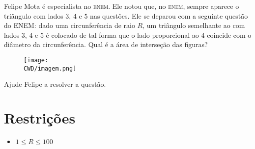 %

Felipe Mota é especialista no \textsc{enem}. Ele notou que, no \textsc{enem}, sempre aparece o triângulo com lados 3, 4 e 5 nas questôes. Ele se deparou com a seguinte questão do \textsc{ENEM}: dado uma circunferência de raio $R$, um triângulo semelhante ao com lados 3, 4 e 5 é colocado de tal forma que o lado proporcional ao 4 coincide com o diâmetro da circunferência. Qual é a área de interseção das figuras?

\begin{figure}[H]
  \centering
  \texttt{[image: \\CWD/imagem.png]}
\end{figure}

Ajude Felipe a resolver a questão.

%
%

%
%


\section*{Restrições}

\begin{itemize}
\item $ 1 \leq R \leq 100$\end{itemize}


\sampleio
